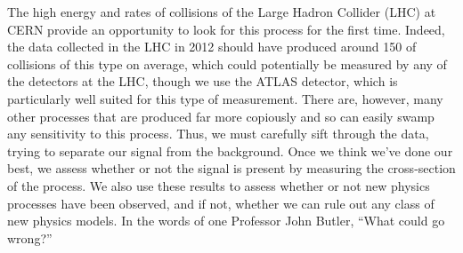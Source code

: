 The high energy and rates of collisions of the Large Hadron Collider (LHC) at CERN
provide an opportunity to look for this process for the first time. 
Indeed, the data collected in the LHC in 2012 should have produced around 150 of collisions
of this type on average, which could potentially be measured by any of the detectors
at the LHC, though we use the ATLAS detector, which is particularly well suited 
for this type of measurement. There are, however, many other processes that are produced
far more copiously and so can easily swamp any sensitivity to this process. 
Thus, we must carefully sift through the data, trying to separate our signal
from the background.  Once we think we've done our best, we assess 
whether or not the signal is present by measuring the cross-section of the process. 
We also use these results to assess whether or not new physics processes have been 
observed, and if not, whether we can rule out any class of new physics models. 
In the words of one Professor John Butler, ``What could go wrong?''


